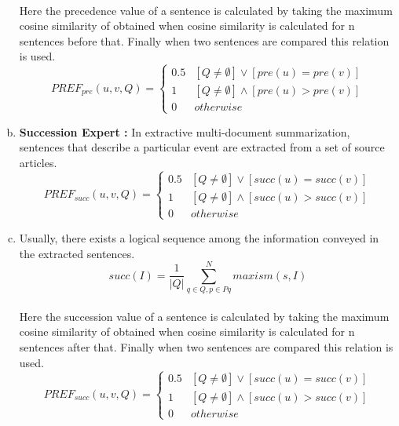 \begin{enumerate}[a. ]
\paragraph{} Here the precedence value of a sentence is calculated by taking the maximum cosine similarity of obtained when cosine similarity is calculated for n sentences before that. Finally when two sentences are compared this relation is used.
\begin{equation}
PREF_{pre}(u,v,Q) = \begin{cases}
	0.5 & [Q \neq \emptyset ] \vee [pre(u) = pre(v)]\\
	1 & [Q \neq \emptyset ] \wedge [pre(u) > pre(v)]\\
	0 & otherwise
\end{cases}
\end{equation}
\item \textbf{Succession Expert :} In extractive multi-document summarization, sentences that 	describe a particular event are extracted from a set of source articles.
\begin{equation}
PREF_{succ}(u,v,Q) = \begin{cases}
	0.5 & [Q \neq \emptyset ] \vee [succ(u) = succ(v)]\\
	1 & [Q \neq \emptyset ] \wedge [succ(u) > succ(v)]\\
	0 & otherwise
\end{cases}
\end{equation}
\item Usually, there exists a logical sequence among the information conveyed in the extracted sentences.
\begin{equation}
succ(I) = \frac{1}{|Q|}\sum_{q \in Q, p \in Pq}^{N} maxism(s,I)
\end{equation}
\paragraph{} Here the succession value of a sentence is calculated by taking the 			maximum cosine similarity of obtained when cosine similarity is calculated for n 	sentences after that. Finally when two sentences are compared this relation is used.
\begin{equation}
PREF_{succ}(u,v,Q) = \begin{cases}
	0.5 & [Q \neq \emptyset ] \vee [succ(u) = succ(v)]\\
	1 & [Q \neq \emptyset ] \wedge [succ(u) > succ(v)]\\
	0 & otherwise
\end{cases}
\end{equation}

\end{enumerate}
